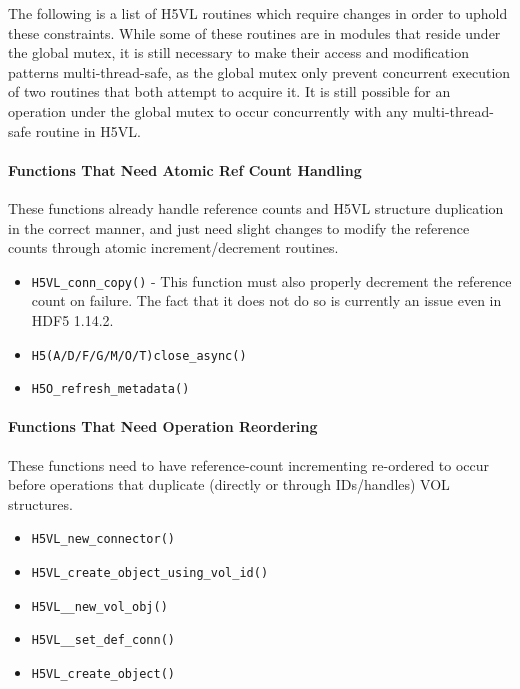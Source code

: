 \documentclass{article}
\begin{document}
 The following is a list of  H5VL routines which require changes in order to uphold these constraints. While some of these routines are in modules that reside under the global mutex, it is still necessary to make their access and modification patterns multi-thread-safe, as the global mutex only prevent concurrent execution of two routines that both attempt to acquire it. It is still possible for an operation under the global mutex to occur concurrently with any multi-thread-safe routine in H5VL.


\paragraph{Functions That Need Atomic Ref Count Handling}

These functions already handle reference counts and H5VL structure duplication in the correct manner, and just need slight changes to modify the reference counts through atomic increment/decrement routines.


\begin{itemize}
    \item \texttt{H5VL\_conn\_copy()} - This function must also properly decrement the reference count on failure. The fact that it does not do so is currently an issue even in HDF5 1.14.2.

    \item \texttt{H5(A/D/F/G/M/O/T)close\_async()}

    \item \texttt{H5O\_refresh\_metadata()}
\end{itemize}


\paragraph{Functions That Need Operation Reordering}

These functions need to have reference-count incrementing re-ordered to occur before operations that duplicate (directly or through IDs/handles) VOL structures.

\begin{itemize}
    \item \texttt{H5VL\_new\_connector()}
    \item \texttt{H5VL\_create\_object\_using\_vol\_id()}
    \item \texttt{H5VL\_\_new\_vol\_obj()}
    \item \texttt{H5VL\_\_set\_def\_conn()}
    \item \texttt{H5VL\_create\_object()}

\end{itemize}
\end{document}
